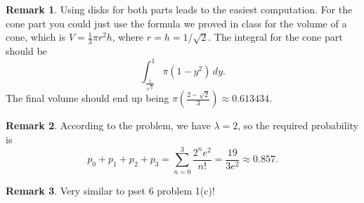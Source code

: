 \documentclass[11pt,oneside]{amsart}
\theoremstyle{definition}
\newtheorem{remark}{Remark}
\begin{document}
\begin{remark}
    Using disks for both parts leads to the easiest computation. For the cone part you could just use the formula we proved in class for the volume of a cone, which is $V=\frac 13\pi r^2h$, where $r=h=1/\sqrt2$. The integral for the cone part should be
    \[\int_{\frac 1{\sqrt2}}^1\pi(1-y^2)\,dy.\]
    The final volume should end up being $\pi \left( \frac{2-\sqrt2}3 \right)\approx 0.613434$.
\end{remark}

\begin{remark}
    According to the problem, we have $\lambda=2$, so the required probability is
    \[p_0+p_1+p_2+p_3=\sum_{n=0}^3\frac{2^n e^2}{n!}=\frac {19}{3e^2}\approx 0.857.\]
\end{remark}

\begin{remark}
    Very similar to pset 6 problem 1(c)!
\end{remark}
\end{document}
